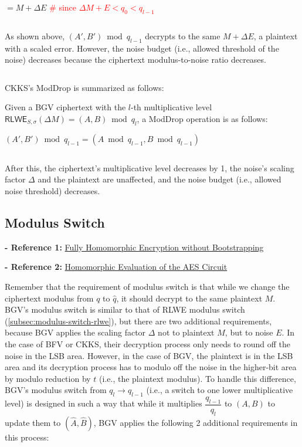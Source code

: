 $= M + \Delta E$ \textcolor{red}{\# since $\Delta M + E < q_0 < q_{l-1}$}

$ $

As shown above, $(A', B') \bmod q_{l-1}$ decrypts to the same $M + \Delta E$, a plaintext with a scaled error. However, the noise budget (i.e., allowed threshold of the noise) decreases because the ciphertext modulus-to-noise ratio decreases. 

$ $

CKKS's \textsf{ModDrop} is summarized as follows:



\begin{tcolorbox}[title={\textbf{\tboxlabel{\ref*{subsec:bgv-mult-plain}} BGV's \textsf{ModDrop}}}]

Given a BGV ciphertext with the $l$-th multiplicative level $\textsf{RLWE}_{S, \sigma}(\Delta M) = (A, B) \bmod q_l$, a \textsf{ModDrop} operation is as follows: 

$(A', B') \bmod q_{l-1} = (A \bmod q_{l-1}, B \bmod q_{l-1})$

$ $

After this, the ciphertext's multiplicative level decreases by 1, the noise's scaling factor $\Delta$ and the plaintext are unaffected, and the noise budget (i.e., allowed noise threshold) decreases. 

\end{tcolorbox}



\subsection{Modulus Switch}
\label{subsec:bgv-modulus-switch}

\noindent \textbf{- Reference 1:} 
\href{https://eprint.iacr.org/2011/277.pdf}{Fully Homomorphic Encryption without Bootstrapping}


\noindent \textbf{- Reference 2:} 
\href{https://eprint.iacr.org/2012/099.pdf}{Homomorphic Evaluation of the AES Circuit}

Remember that the requirement of modulus switch is that while we change the ciphertext modulus from $q$ to $\hat q$, it should decrypt to the same plaintext $M$. BGV's modulus switch is similar to that of RLWE modulus switch (\autoref{subsec:modulus-switch-rlwe}), but there are two additional requirements, because BGV applies the scaling factor $\Delta$ not to plaintext $M$, but to noise $E$. In the case of BFV or CKKS, their decryption process only needs to round off the noise in the LSB area. However, in the case of BGV, the plaintext is in the LSB area and its decryption process has to modulo off the noise in the higher-bit area by modulo reduction by $t$ (i.e., the plaintext modulus). To handle this difference, BGV's modulus switch from $q_l \rightarrow q_{l-1}$ (i.e., a switch to one lower multiplicative level) is designed in such a way that while it multiplies $\dfrac{q_{l-1}}{q_l}$ to $(A, B)$ to update them to $(\hat A, \hat B)$, BGV applies the following 2 additional requirements in this process:


